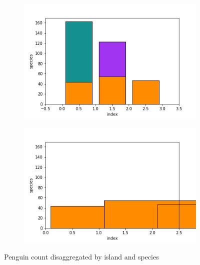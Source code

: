 \documentclass[../main.tex]{subfiles}
\begin{document}
\begin{figure}[H]
    \begin{subfigure}{0.5\textwidth}
        \includegraphics[width=\textwidth]{figures/code/bar_stacked.png}
    \end{subfigure}
    \begin{subfigure}{0.5\textwidth}
        \includegraphics[width=\textwidth]{figures/code/bar_grouped.png}
    \end{subfigure}
    \caption{Penguin count disaggregated by island and species}
    \label{fig:code_bar_multi}
\end{figure}
\end{document}
